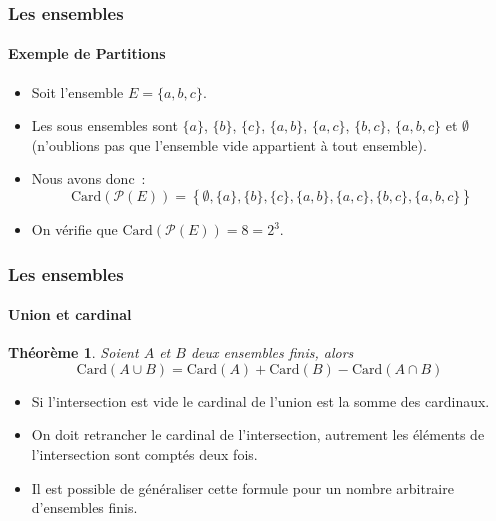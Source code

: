 \documentclass[10pt,notheorems]{beamer}
\theoremstyle{plain}
\newtheorem{theorem}{Théorème}
\theoremstyle{definition} %
\begin{document}
\begin{frame}
  \frametitle{Les ensembles}
  \framesubtitle{Exemple de Partitions}
  \hypertarget{slide_ensembles_exemple_partitions}{}

  \begin{itemize}

  \item Soit l'ensemble $E = \{a,b,c\}$.\newline

  \item Les sous ensembles sont $\{a\}$, $\{b\}$, $\{c\}$, $\{a,b\}$, $\{a,c\}$, $\{b,c\}$, $\{a,b,c\}$ et $\emptyset$ (n'oublions pas que l'ensemble vide appartient à tout ensemble).\newline

  \item Nous avons donc~:
    \[
      \textrm{Card}(\mathcal P(E)) = \left\{\emptyset, \{a\}, \{b\}, \{c\}, \{a,b\}, \{a,c\}, \{b,c\}, \{a,b,c\}\right\}
    \]

  \item On vérifie que $\textrm{Card}(\mathcal P(E)) = 8 = 2^3$.

  \end{itemize}

\end{frame}


\begin{frame}
  \frametitle{Les ensembles}
  \framesubtitle{Union et cardinal}
  \hypertarget{slide_ensembles_union_cardnal}{}

  \begin{theorem}\label{thm:union_cardinal} Soient $A$ et $B$ deux ensembles finis, alors
    \[
      \textrm{Card}(A \cup B) = \textrm{Card}(A) + \textrm{Card}(B) - \textrm{Card}(A \cap B)
    \]
  \end{theorem}

  \bigskip

  \begin{itemize}
  \item Si l'intersection est vide le cardinal de l'union est la somme des cardinaux.\newline
  \item On doit retrancher le cardinal de l'intersection, autrement les éléments de l'intersection sont comptés deux fois.\newline
  \item Il est possible de généraliser cette formule pour un nombre arbitraire d'ensembles finis.
  \end{itemize}
\end{frame}
\end{document}
